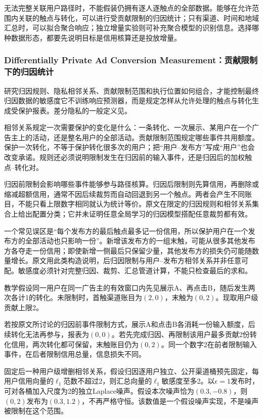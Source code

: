 无法完整关联用户路径时，不能假装仍拥有逐人逐触点的全部数据。能够在允许范围内关联的触点与转化，可以进行受贡献限制的归因统计；只有渠道、时间和地域汇总时，可以拟合聚合响应；独立增量实验则可补充聚合模型的识别信息。选择哪种数据形态，都要先说明目标是信用核算还是投放增量。

\subsubsection{Differentially Private Ad Conversion Measurement：贡献限制下的归因统计}
\label{sec:rs-advertising-dp-measurement}

研究归因规则、隐私相邻关系、贡献限制范围和执行位置如何组合，才能控制最终归因数据的敏感度它不训练响应预测器，而是规定怎样从允许处理的触点与转化生成受保护报表。差分隐私的一般定义见。

相邻关系规定一次需要保护的变化是什么：一条转化、一次展示、某用户在一个广告主上的活动，还是整名用户的全部活动。贡献限制范围规定哪些事件共用额度。保护一次转化，不等于保护转化很多次的用户；把“用户--发布方”写成“用户”也会改变承诺。规则还必须说明限制发生在归因前的输入事件，还是归因后的加权触点--转化对。

归因前限制会影响哪些事件能够参与路径核算。归因后限制则先算信用，再删除或缩减超额信用，通常不因后续裁剪而自动回退到另一个触点。两者会产生不同账目，不能只看上限数字相同就认为统计等价。原文在限定的归因规则和相邻关系集合上给出配置分类；它并未证明任意全局学习的归因模型搭配任意裁剪都有效。

一个常见误区是“每个发布方的最后触点最多记一份信用，所以保护用户在一个发布方的全部活动也只影响一份”。新增该发布方的一组末触，可能从很多其他发布方各夺走一份信用；即使新增一侧最后只保留少量，其他发布方的损失仍可能随数量增长。原文用此类构造说明，后归因限制与用户--发布方相邻关系并非任意可配。敏感度必须针对完整归因、裁剪、汇总管道计算，不能只检查最后的求和。

\begin{example}[归因前后裁剪的区别]
教学假设同一用户在同一广告主的有效窗口内先见展示A、再点击B，随后发生两次各计1的转化。未限制时，首触渠道账目为$(2,0)$，末触为$(0,2)$。现取用户级贡献上限2。

若按原文所讨论的归因前事件限制方式，展示A和点击B各消耗一份输入额度，后续转化无法再参与，报表为$(0,0)$。若先完成归因、再限制该用户最多贡献2份转化信用，两次转化都可保留，末触账目仍为$(0,2)$。同一个数字2在前者限制输入事件，在后者限制信用总量，信息损失不同。

固定后一种用户级增删相邻关系，假设归因逐用户独立、公开渠道桶预先固定，每用户信用向量的$\ell_1$范数不超过2，则汇总向量的$\ell_1$敏感度至多2。以$\epsilon=1$发布时，可对各桶加入尺度为2的独立Laplace噪声。假设本次噪声恰为$(0.3,-0.8)$，则$(0,2)$发布为$(0.3,1.2)$，不再严格守恒。该数值是一个假设噪声实现，不是噪声被限制在这个范围。
\end{example}

